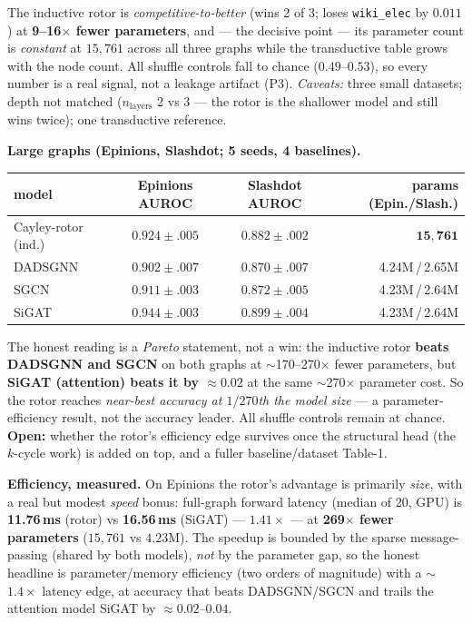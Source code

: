\documentclass[11pt]{article}
\begin{document}
\noindent The inductive rotor is \emph{competitive-to-better} (wins 2 of 3; loses
\texttt{wiki\_elec} by $0.011$) at \textbf{9--16$\times$ fewer parameters}, and ---
the decisive point --- its parameter count is \emph{constant} at $15{,}761$ across
all three graphs while the transductive table grows with the node count. All
shuffle controls fall to chance ($0.49$--$0.53$), so every number is a real signal,
not a leakage artifact (P3). \emph{Caveats:} three small datasets; depth not
matched ($n_{\text{layers}}$ 2 vs 3 --- the rotor is the shallower model and still
wins twice); one transductive reference.

\noindent\textbf{Large graphs (Epinions, Slashdot; 5 seeds, 4 baselines).}
\begin{center}\small
\begin{tabular}{lccr}
\toprule
model & Epinions AUROC & Slashdot AUROC & params (Epin./Slash.)\\
\midrule
Cayley-rotor (ind.) & $0.924{\pm}.005$ & $0.882{\pm}.002$ & $\mathbf{15{,}761}$\\
DADSGNN & $0.902{\pm}.007$ & $0.870{\pm}.007$ & 4.24M\,/\,2.65M\\
SGCN & $0.911{\pm}.003$ & $0.872{\pm}.005$ & 4.23M\,/\,2.64M\\
SiGAT & $\mathbf{0.944{\pm}.003}$ & $\mathbf{0.899{\pm}.004}$ & 4.23M\,/\,2.64M\\
\bottomrule
\end{tabular}
\end{center}

\noindent The honest reading is a \emph{Pareto} statement, not a win: the inductive
rotor \textbf{beats DADSGNN and SGCN} on both graphs at $\sim$170--270$\times$ fewer
parameters, but \textbf{SiGAT (attention) beats it by $\approx 0.02$} at the same
$\sim$270$\times$ parameter cost. So the rotor reaches \emph{near-best accuracy at
$1/270$th the model size} --- a parameter-efficiency result, not the accuracy
leader. All shuffle controls remain at chance. \textbf{Open:} whether the rotor's
efficiency edge survives once the structural head (the $k$-cycle work) is added on
top, and a fuller baseline/dataset Table-1.

\noindent\textbf{Efficiency, measured.} On Epinions the rotor's advantage is
primarily \emph{size}, with a real but modest \emph{speed} bonus: full-graph
forward latency (median of 20, GPU) is \textbf{11.76\,ms} (rotor) vs
\textbf{16.56\,ms} (SiGAT) --- $1.41\times$ --- at \textbf{269$\times$ fewer
parameters} ($15{,}761$ vs $4.23$M). The speedup is bounded by the sparse
message-passing (shared by both models), \emph{not} by the parameter gap, so the
honest headline is parameter/memory efficiency (two orders of magnitude) with a
$\sim$$1.4\times$ latency edge, at accuracy that beats DADSGNN/SGCN and trails the
attention model SiGAT by $\approx 0.02$--$0.04$.
\end{document}
